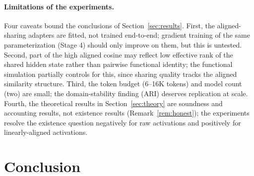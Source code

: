 \documentclass{article}
\begin{document}
\paragraph{Limitations of the experiments.}
Four caveats bound the conclusions of Section~\ref{sec:results}. First,
the aligned-sharing adapters are fitted, not trained end-to-end; gradient
training of the same parameterization (Stage 4) should only improve on
them, but this is untested. Second, part of the high aligned cosine may
reflect low effective rank of the shared hidden state rather than pairwise
functional identity; the functional simulation partially controls for
this, since sharing quality tracks the aligned similarity structure.
Third, the token budget (6--16K tokens) and model count (two) are small;
the domain-stability finding (ARI) deserves replication at scale. Fourth,
the theoretical results in Section~\ref{sec:theory} are soundness and
accounting results, not existence results (Remark~\ref{rem:honest}); the
experiments resolve the existence question negatively for raw activations
and positively for linearly-aligned activations.

\section{Conclusion}
\end{document}
